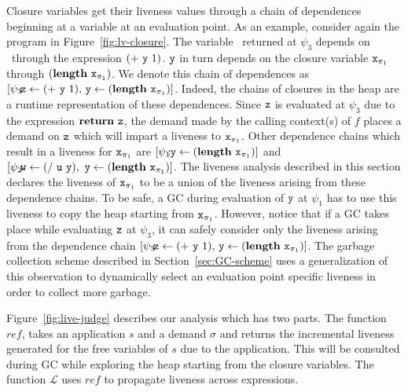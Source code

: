 \documentclass[9pt,preprint,nonatbib]{sigplanconf}
\begin{document}
 
Closure  variables  get  their  liveness values  through  a  chain  of
dependences beginning  at a  variable at an  evaluation point.   As an
example,  consider again  the program  in Figure~\ref{fig:lv-closure}.
The variable  \pz\ returned  at $\psi_3$ depends  on \py\  through the
expression $(+~\mbox{\tt y}~1)$.  $\mbox{\tt y}$ in turn depends on the closure variable
$\mbox{\tt x}_{\mathit{\pi}_1}$  through $(\mathbf{length}~\mbox{\tt x}_{\mathit{\pi}_1})$.   We
denote this  chain of  dependences as  $\lbrack \psi_3\!\!\!:\!\!\!\mbox{\tt z}
\leftarrow            (+~\mbox{\tt y}~1),\,           \mbox{\tt y}            \leftarrow
(\mathbf{length}~\mbox{\tt x}_{\mathit{\pi}_1})\rbrack$.    Indeed,   the   chains   of
closures  in   the  heap  are   a  runtime  representation   of  these
dependences.   Since  $\mbox{\tt z}$  is  evaluated  at  $\psi_3$  due  to  the
expression $\mbox{$\mathbf{ return}$}~\mbox{\tt z}$,  the demand made by  the calling context(s)
of  $f$ places  a demand  on  $\mbox{\tt z}$ which  will impart  a liveness  to
$\mbox{\tt x}_{\pi_1}$.  Other dependence chains which result in a liveness for
$\mbox{\tt x}_{\pi_1}$    are    $\lbrack    \psi_1\!\!\!:\!\!\mbox{\tt y}    \leftarrow
(\mathbf{length}~\mbox{\tt x}_{\pi_1})\rbrack$   and  $\lbrack   \psi_2\!\!\!:\!\!\!\mbox{\tt w}
\leftarrow          (/~\mbox{\tt u}~\mbox{\tt y}),\,\,           \mbox{\tt y}          \leftarrow
(\mathbf{length}~\mbox{\tt x}_{\pi_1})\rbrack$.   The  liveness analysis  described  in
this section declares  the liveness of $\mbox{\tt x}_{\pi_1}$ to be  a union of
the liveness arising  from these dependence chains.  To be  safe, a GC
during evaluation  of $\mbox{\tt y}$ at  $\psi_1$ has  to use this  liveness to
copy the heap starting from  $\mbox{\tt x}_{\pi_1}$.  However, notice that if a
GC  takes place  while evaluating  $\mbox{\tt z}$  at $\psi_3$,  it can  safely
consider only the liveness arising from the dependence chain\linebreak
$\lbrack \psi_3\!\!\!:\!\!\!\mbox{\tt z} \leftarrow (+~\mbox{\tt y}~1),\, \mbox{\tt y} \leftarrow
(\mathbf{length}~\mbox{\tt x}_{\pi_1})\rbrack$.    The    garbage   collection   scheme
described in Section~\ref{sec:GC-scheme} uses a generalization of this
observation  to  dynamically  select   an  evaluation  point  specific
liveness in order to collect more garbage.



Figure~\ref{fig:live-judge}  describes  our  analysis  which  has  two
parts. The  function $\mathit{ref}$,  takes an  application $s$  and a
demand $\sigma$ and returns the incremental liveness generated for the
free variables of $s$ due to  the application.  This will be consulted
during GC  while exploring the heap  starting from the
closure  variables.  The function $\mathcal{L}$  uses  $\mathit{ref}$ to  propagate
liveness across expressions.
\end{document}
